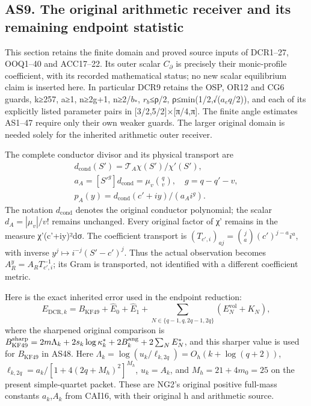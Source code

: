 \documentclass[11pt]{article}
\begin{document}
\subsection{AS9. The original arithmetic receiver and its remaining endpoint statistic}\label{as9.-the-original-arithmetic-receiver-and-its-remaining-endpoint-statistic}

This section retains the finite domain and proved source inputs of DCR1--27, OOQ1--40 and ACC17--22. Its outer scalar \(C_\partial\) is precisely their monic-profile coefficient, with its recorded mathematical status; no new scalar equilibrium claim is inserted here. In particular DCR9 retains the OSP, OR12 and CG6 guards, k≥257, a≥1, n≥2g+1, n≥2/\(b_*\), \(r_b\)≤ρ/2, ρ≤min(1/2,√(\(a_eq\)/2)), and each of its explicitly listed parameter pairs in {[}3/2,5/2{]}×{[}π/4,π{]}. The finite angle estimates AS1--47 require only their own weaker guards. The larger original domain is needed solely for the inherited arithmetic outer receiver.

The complete conductor divisor and its physical transport are \[
\begin{gathered}d_{\mathrm{cond}}(S')=\mathcal T_A\chi(S')/\chi'(S'),\\
a_A=[S'^g]d_{\mathrm{cond}}=\mu_v\binom qv,\quad g=q-q'-v,
\\ p_A(y)=d_{\mathrm{cond}}(c'+iy)/(a_Ai^g).\end{gathered}
\] The notation \(d_{\mathrm{cond}}\) denotes the original conductor polynomial; the scalar \(d_A=|\mu_v|/v!\) remains unchanged. Every original factor of χ' remains in the measure \textbar χ'(c'+iy)\textbar²dσ. The coefficient transport is \((T_{c',i})_{aj}=\binom ja(c')^{j-a}i^a\), with inverse \(y^j\mapsto i^{-j}(S'-c')^j\). Thus the actual observation becomes \(A_R^y=A_RT_{c',i}^{-1}\); its Gram is transported, not identified with a different coefficient metric.

Here is the exact inherited error used in the endpoint reduction: \[
E_{\mathrm{DCR},k}=B_{\mathrm{KF49}}+\widehat E_0+\widehat E_1
+\sum_{N\in\{q-1,q,2q-1,2q\}}(E_N^{\mathrm{vol}}+K_N),
\tag{AS48}
\] where the sharpened original comparison is \(B_{\rm KF49}^{\rm sharp}=2m\Lambda_k+2s_k\log\kappa_k^*
+2B_k^{\rm ang}+2\sum_NE_N^*\), and this sharper value is used for \(B_{\mathrm{KF49}}\) in AS48. Here \(\Lambda_k=\log(u_k/\ell_{k,2q})=O_h(k+\log(q+2))\), \(\ell_{k,2q}=a_k/[1+4(2q+M_h)^2]^{M_h}\), \(u_k=A_k\), and \(M_h=21+4m_0=25\) on the present simple-quartet packet. These are NG2's original positive full-mass constants \(a_k\),\(A_k\) from CAI16, with their original h and arithmetic source.
\end{document}
